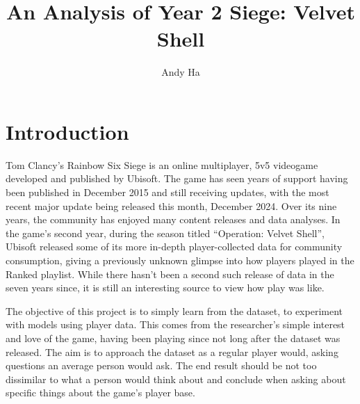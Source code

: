 \documentclass[12pt]{article}
\title{An Analysis of Year 2 Siege: Velvet Shell}
\author{Andy Ha}
\date{}
\begin{document}
\maketitle


\tableofcontents
\newpage


\section{Introduction}
Tom Clancy's Rainbow Six Siege is an online multiplayer, 5v5 videogame developed and published by Ubisoft.
The game has seen years of support having been published in December 2015 and still receiving updates, with the most recent major update being released this month, December 2024.
Over its nine years, the community has enjoyed many content releases and data analyses.
In the game's second year, during the season titled ``Operation: Velvet Shell'', Ubisoft released some of its more in-depth player-collected data for community consumption, giving a previously unknown glimpse into how players played in the Ranked playlist.
While there hasn't been a second such release of data in the seven years since, it is still an interesting source to view how play was like.

The objective of this project is to simply learn from the dataset, to experiment with models using player data.
This comes from the researcher's simple interest and love of the game, having been playing since not long after the dataset was released.
The aim is to approach the dataset as a regular player would, asking questions an average person would ask.
The end result should be not too dissimilar to what a person would think about and conclude when asking about specific things about the game's player base.
\end{document}
